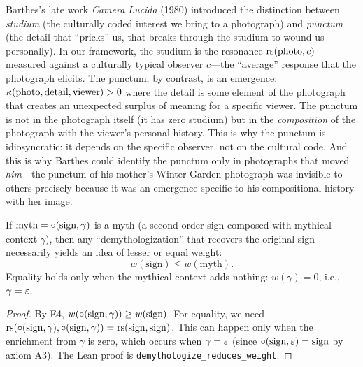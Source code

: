 \begin{remark}
Barthes's late work \textit{Camera Lucida} (1980) introduced the distinction between \emph{studium} (the culturally coded interest we bring to a photograph) and \emph{punctum} (the detail that ``pricks'' us, that breaks through the studium to wound us personally). In our framework, the studium is the resonance $\mathrm{rs}(\text{photo}, c)$ measured against a culturally typical observer $c$---the ``average'' response that the photograph elicits. The punctum, by contrast, is an emergence: $\kappa(\text{photo}, \text{detail}, \text{viewer}) > 0$ where the detail is some element of the photograph that creates an unexpected surplus of meaning for a specific viewer. The punctum is not in the photograph itself (it has zero studium) but in the \emph{composition} of the photograph with the viewer's personal history. This is why the punctum is idiosyncratic: it depends on the specific observer, not on the cultural code. And this is why Barthes could identify the punctum only in photographs that moved \emph{him}---the punctum of his mother's Winter Garden photograph was invisible to others precisely because it was an emergence specific to his compositional history with her image.
\end{remark}

\begin{theorem}
\label{thm:demythologize}
If $\text{myth} = \circ(\text{sign}, \gamma)$ is a myth (a second-order sign composed with mythical context $\gamma$), then any ``demythologization'' that recovers the original sign necessarily yields an idea of lesser or equal weight:
\[
  w(\text{sign}) \leq w(\text{myth}).
\]
Equality holds only when the mythical context adds nothing: $w(\gamma) = 0$, i.e., $\gamma = \varepsilon$.
\end{theorem}

\begin{proof}
By E4, $w(\circ(\text{sign}, \gamma)) \geq w(\text{sign})$. For equality, we need $\mathrm{rs}(\circ(\text{sign}, \gamma), \circ(\text{sign}, \gamma)) = \mathrm{rs}(\text{sign}, \text{sign})$. This can happen only when the enrichment from $\gamma$ is zero, which occurs when $\gamma = \varepsilon$ (since $\circ(\text{sign}, \varepsilon) = \text{sign}$ by axiom A3). The Lean proof is \texttt{demythologize\_reduces\_weight}.
\end{proof}

